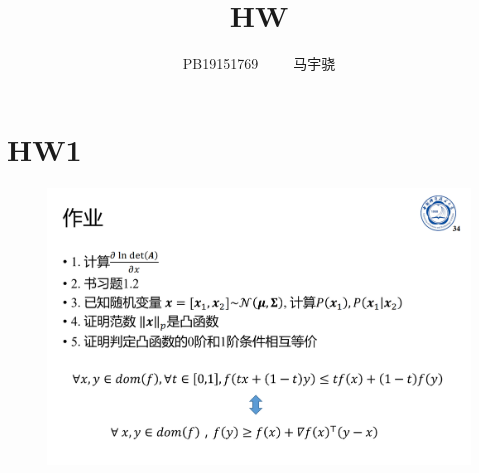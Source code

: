 \documentclass[UTF8,a4paper,AutoFakeBold,AutoFakeSlant]{article}
\title{\textbf{\textsf{{\textsf{HW} \heiti{机器学习概论}}}}}
\author{\song PB19151769~~~~~马宇骁}
\date{}
\begin{document}
\maketitle

\tableofcontents
\newpage




\section{HW1}
\begin{figure}[htbp]
  \centering
  \includegraphics[scale=0.425]{hw1.png}
  \label{f1}
\end{figure}
\end{document}
